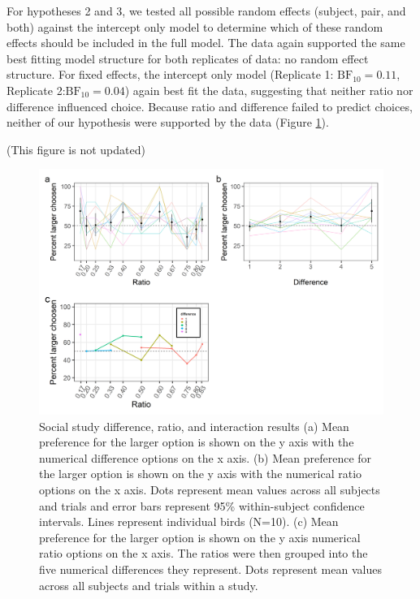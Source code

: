 \documentclass[
  ,doc,floatsintext]{apa6}
\begin{document}
For hypotheses 2 and 3, we tested all possible random effects (subject, pair, and both) against the intercept only model to determine which of these random effects should be included in the full model. The data again supported the same best fitting model structure for both replicates of data: no random effect structure. For fixed effects, the intercept only model (Replicate 1: \(\mathrm{BF}_{\textrm{10}} = 0.11\), Replicate 2:\(\mathrm{BF}_{\textrm{10}} = 0.04\)) again best fit the data, suggesting that neither ratio nor difference influenced choice. Because ratio and difference failed to predict choices, neither of our hypothesis were supported by the data (Figure \ref{fig:socialgraphs}).

(This figure is not updated)


\begin{figure}

{\centering \includegraphics[width=1\linewidth]{../figures/social_figures} 

}

\caption{Social study difference, ratio, and interaction results (a) Mean preference for the larger option is shown on the y axis with the numerical difference options on the x axis. (b) Mean preference for the larger option is shown on the y axis with the numerical ratio options on the x axis. Dots represent mean values across all subjects and trials and error bars represent 95\% within-subject confidence intervals. Lines represent individual birds (N=10). (c) Mean preference for the larger option is shown on the y axis numerical ratio options on the x axis. The ratios were then grouped into the five numerical differences they represent. Dots represent mean values across all subjects and trials within a study.}\label{fig:socialgraphs}
\end{figure}
\end{document}
